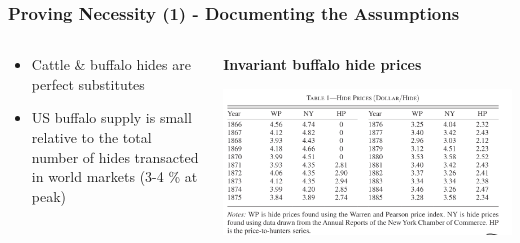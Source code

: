\documentclass[aspectratio=169, 12pt, final]{beamer}
\begin{document}


\begin{frame}
\frametitle{Proving Necessity (1) - Documenting the Assumptions}
\begin{columns}
\begin{column}{0.5\textwidth}  %
\begin{itemize}
	\item Cattle \& buffalo hides are perfect substitutes
	\item US buffalo supply is small relative to the total number of hides transacted in world markets (3-4 \% at peak)
\end{itemize}\end{column}
\begin{column}{0.5\textwidth}
\textbf{Invariant buffalo hide prices}
\begin{center}
\includegraphics[width=1\textwidth]{Table1.jpeg}	
\end{center}	
\end{column}
\end{columns}
\end{frame}
\end{document}
